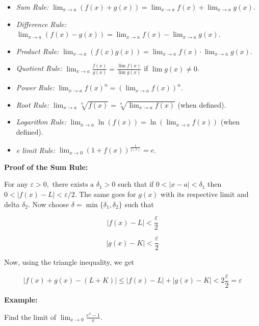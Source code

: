 \begin{itemize}
     
    \item \emph{Sum Rule:} \( \lim_{x \to a} (f(x) + g(x)) = \lim_{x \to a} f(x) + \lim_{x \to a} g(x)\).

    \item \emph{Difference Rule:} \( \lim_{x \to a} (f(x) - g(x)) = \lim_{x \to a} f(x) - \lim_{x \to a} g(x)\).

    \item \emph{Product Rule:} \( \lim_{x \to a} (f(x)g(x)) = \lim_{x \to a} f(x) \cdot \lim_{x \to a} g(x)\).

    \item \emph{Quotient Rule:} \(\lim_{x \to a} \frac{f(x)}{g(x)} = \frac{\lim f(x)}{\lim g(x)}\) if \(\lim g(x) \ne 0\).

    \item \emph{Power Rule:} \( \lim_{x \to a} {f(x)}^n = {(\lim_{x \to a} f(x))}^n\).

    \item \emph{Root Rule:} \( \lim_{x \to a} \sqrt[n]{f(x)} = \sqrt[n]{\lim_{x \to a} f(x)}\) (when defined).

    \item \emph{Logarithm Rule:} \( \lim_{x \to a} \ln(f(x)) = \ln(\lim_{x \to a} f(x))\) (when defined).

    \item \emph{e limit Rule:}   \(\lim_{x \to 0} (1 + f(x))^{\frac{1}{f(x)}} = e\).

\end{itemize}

\textbf{Proof of the Sum Rule:}

For any \(\varepsilon > 0, \text{ there exists a } \delta_1 > 0\) such that if \(0 < |x - a| < \delta_1\) then \(0 < |f(x) - L| < \varepsilon/2\). 
The same goes for \(g(x)\) with its respective limit and delta \(\delta_2\). Now choose \(\delta = \min\{\delta_1, \delta_2\}\) such that

\[
    |f(x) - L| < \frac{\varepsilon}{2}
\]

\[
    |g(x) - K| < \frac{\varepsilon}{2}
\]

Now, using the triangle inequality, we get 

\[
    |f(x) + g(x) - (L + K)| \le |f(x) - L|  + |g(x) - K| < 2\frac{\varepsilon}{2} = \varepsilon
\]

\QED

\textbf{Example:}

Find the limit of \(\lim_{x \to 0} \frac{e^x - 1}{x}\).

